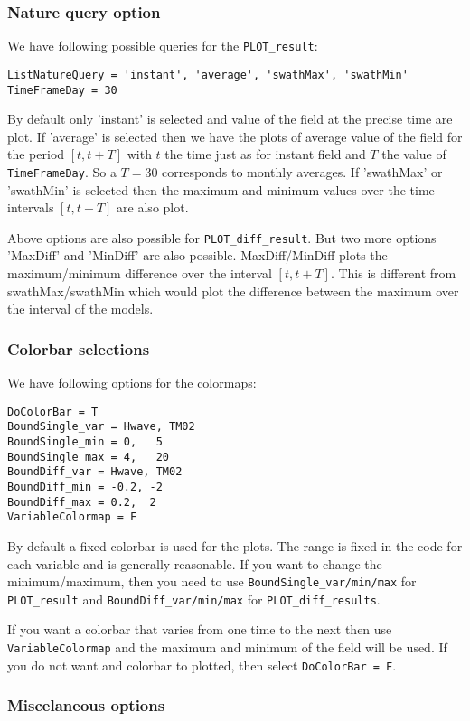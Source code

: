 \documentclass[12pt]{amsart}
\begin{document}
\subsubsection{Nature query option}
We have following possible queries for the {\tt PLOT\_result}:
\begin{verbatim}
ListNatureQuery = 'instant', 'average', 'swathMax', 'swathMin'
TimeFrameDay = 30
\end{verbatim}
By default only 'instant' is selected and value of the field at the precise time are plot.
If 'average' is selected then we have the plots of average value of the field for the period $[t, t+ T]$ with $t$ the time just as for instant field and $T$ the value of {\tt TimeFrameDay}. So a $T=30$ corresponds to monthly averages.
If 'swathMax' or 'swathMin' is selected then the maximum and minimum values over the time intervals $[t, t+T]$ are also plot.

Above options are also possible for {\tt PLOT\_diff\_result}. But two more options 'MaxDiff' and 'MinDiff' are also possible. MaxDiff/MinDiff plots the maximum/minimum difference over the interval $[t, t+T]$. This is different from swathMax/swathMin which would plot the difference between the maximum over the interval of the models.

\subsubsection{Colorbar selections}
We have following options for the colormaps:
\begin{verbatim}
DoColorBar = T
BoundSingle_var = Hwave, TM02
BoundSingle_min = 0,   5
BoundSingle_max = 4,   20
BoundDiff_var = Hwave, TM02
BoundDiff_min = -0.2, -2
BoundDiff_max = 0.2,  2
VariableColormap = F
\end{verbatim}
By default a fixed colorbar is used for the plots. The range is fixed in the code for each variable and is generally reasonable. If you want to change the minimum/maximum, then you need to use {\tt BoundSingle\_var/min/max} for {\tt PLOT\_result} and {\tt BoundDiff\_var/min/max} for {\tt PLOT\_diff\_results}.

If you want a colorbar that varies from one time to the next then use {\tt VariableColormap} and the maximum and minimum of the field will be used. If you do not want and colorbar to plotted, then select {\tt DoColorBar = F}.




\subsubsection{Miscelaneous options}
\end{document}
